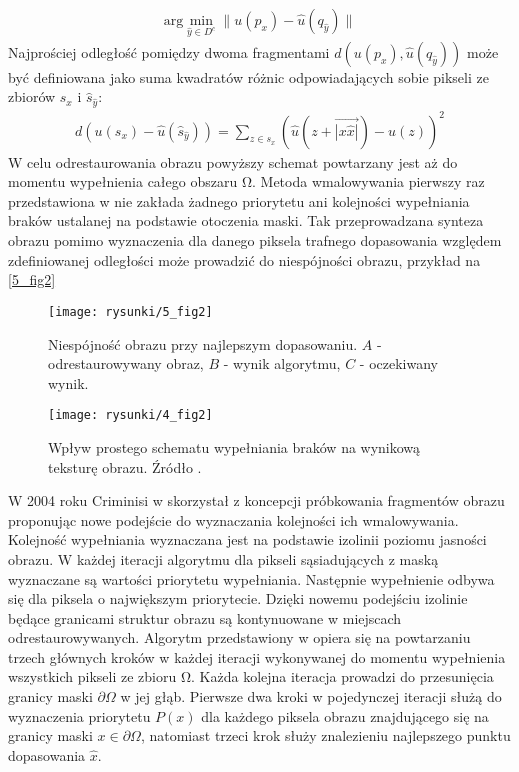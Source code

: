 \documentclass[12pt, twoside, openany]{report}
\theoremstyle{definition}
\begin{document}
\begin{align}
\mathrm{arg} \mathop{\mathrm{min}}_{\hat{y} \in D^c} \big\| u(p_x) - \hat{u} (q_{\hat{y}} ) \big\| 
\label{FROBDIST}
\end{align}
Najprościej odległość pomiędzy dwoma fragmentami $d\left( u(p_x), \hat{u} (q_{\hat{y}}) \right)$ może być definiowana jako suma kwadratów różnic odpowiadających sobie pikseli ze zbiorów $s_x$ i ${\hat{s}}_{\hat{y}}$:
\begin{align}
d\left( u(s_x) - \hat{u}( \hat{s}_{\hat{y}} )\right)= \sum_{z \in s_x} \left( \hat{u}(z + \overrightarrow{|x \hat{x}|}) - u(z) \right)^2
\label{FROBENIUS2} 
\end{align}
W celu odrestaurowania obrazu powyższy schemat powtarzany jest aż do momentu wypełnienia całego obszaru $\mathrm{\Omega }$.
Metoda wmalowywania pierwszy raz przedstawiona w  \cite{efros1999texture} nie zakłada żadnego priorytetu ani kolejności wypełniania braków ustalanej na podstawie otoczenia maski. Tak przeprowadzana synteza obrazu pomimo wyznaczenia dla danego piksela trafnego dopasowania względem zdefiniowanej odległości może prowadzić do niespójności obrazu, przykład na \autoref{5_fig2}
\begin{figure}[!h]
	\centering
	\texttt{[image: rysunki/5\_fig2]}
	\caption{Niespójność obrazu przy najlepszym dopasowaniu. $A$ - odrestaurowywany obraz, $B$ - wynik algorytmu, $C$ - oczekiwany wynik.}
	\label{5_fig2} 
\end{figure}
\begin{figure}[!h]
	\centering
	\texttt{[image: rysunki/4\_fig2]}
	\caption{Wpływ prostego schematu wypełniania braków na wynikową teksturę obrazu. Źródło \cite{criminisi2004region}.}
	\label{4_fig2} 
\end{figure}
W 2004 roku Criminisi w \cite{criminisi2004region} skorzystał z koncepcji próbkowania fragmentów obrazu proponując nowe podejście do wyznaczania kolejności ich wmalowywania.  Kolejność wypełniania wyznaczana jest na podstawie izolinii poziomu jasności obrazu. W każdej iteracji algorytmu dla pikseli sąsiadujących z maską wyznaczane są wartości priorytetu wypełniania. Następnie wypełnienie odbywa się dla piksela o największym priorytecie. Dzięki nowemu podejściu izolinie będące granicami struktur obrazu są kontynuowane w miejscach odrestaurowywanych.
Algorytm przedstawiony w \cite{criminisi2004region} opiera się na powtarzaniu trzech głównych kroków w każdej iteracji wykonywanej do momentu wypełnienia wszystkich pikseli ze zbioru $\mathrm{\Omega }$.
Każda kolejna iteracja prowadzi do przesunięcia granicy maski $\partial \Omega$ w jej głąb. Pierwsze dwa kroki w pojedynczej iteracji służą do wyznaczenia priorytetu $P\left(x\right)$ dla każdego piksela obrazu znajdującego się na granicy maski $x \in \partial \Omega$, natomiast trzeci krok służy znalezieniu najlepszego punktu dopasowania $\hat{x}$.
\end{document}
